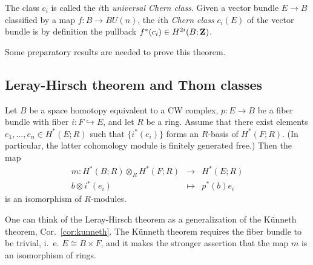 \documentclass[a4paper,openany]{scrbook}
\begin{document}
The class $c_i$ is called the $i$th \emph{universal Chern class}. Given a vector bundle $E \to B$ classified by a map $f\colon B \to BU(n)$, the $i$th \emph{Chern class} $c_i(E)$ of the vector bundle is by definition the pullback $f^*(c_i) \in H^{2i}(B;\mathbf Z)$.

Some preparatory results are needed to prove this theorem.

\subsection{Leray-Hirsch theorem and Thom classes}

\begin{thm} \label{thm:leray-hirsch}
Let $B$ be a space homotopy equivalent to a CW complex,  $p\colon E \to B$ be a fiber bundle with fiber $i\colon F \hookrightarrow E$, and let $R$ be a ring. Assume that there exist elements $e_1,\dots,e_n \in H^*(E;R)$ such that $\{i^*(e_i)\}$ forms an $R$-basis of $H^*(F;R)$. (In particular, the latter cohomology module is finitely generated free.) Then the map
\begin{align*}
m\colon H^*(B;R) \otimes_R H^*(F;R) &\to& H^*(E;R)\\
b \otimes i^*(e_i) &\mapsto& p^*(b)e_i
\end{align*}
is an isomorphism of $R$-modules. 
\end{thm}

One can think of the Leray-Hirsch theorem as a generalization of the Künneth theorem, Cor.~\ref{cor:kunneth}. The Künneth theorem requires the fiber bundle to be trivial, i.~e. $E \cong B \times F$, and it makes the stronger assertion that the map $m$ is an isomorphism of rings.
\end{document}
